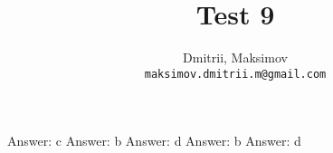 \documentclass{homework}
\title{Test 9}
\author{
  Dmitrii, Maksimov\\
  \texttt{maksimov.dmitrii.m@gmail.com}
}
\begin{document}
\maketitle

\exercise*
Answer: c
\exercise*
Answer: b
\exercise*
Answer: d
\exercise*
Answer: b
\exercise*
Answer: d
\end{document}
